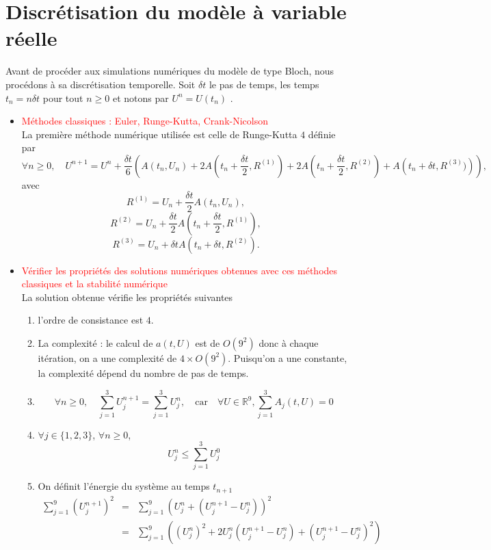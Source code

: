\documentclass[a4paper]{article}
\begin{document}
\section{Discrétisation du modèle à variable réelle}
Avant de procéder aux simulations numériques du modèle de type Bloch, nous procédons à sa discrétisation temporelle. Soit $\delta t$ le pas de temps, les temps $t_n = n \delta t$  pour tout  $n\geq 0$ et notons par $U^n =U(t_n)$ .
\begin{itemize}
\item \textcolor{red}{Méthodes classiques : Euler, Runge-Kutta, Crank-Nicolson}
\\La première méthode numérique utilisée est celle de Runge-Kutta $4$ définie par 
\begin{equation*}
\forall n \geq 0, \quad U^{n+1}=U^n + \frac{\delta t}{6}\left( A(t_n,U_n)+2A\left(t_n+\frac{\delta t}{2},R^{(1)}\right)+2A\left(t_n+\frac{\delta t}{2},R^{(2)}\right)+A\left(t_n+\delta t,R^{(3)})\right)\right),
\end{equation*}
avec 
$$R^{(1)}=U_n + \frac{\delta t}{2} A(t_n,U_n),$$
$$R^{(2)}=U_n + \frac{\delta t}{2} A\left(t_n+\frac{\delta t}{2},R^{(1)}\right),$$
$$R^{(3)}=U_n + \delta t A\left(t_n+\delta t,R^{(2)}\right).$$
\item \textcolor{red}{Vérifier les propriétés des solutions numériques obtenues avec ces méthodes classiques et la stabilité numérique}
\\La solution obtenue vérifie les propriétés suivantes 
\begin{enumerate}
\item l'ordre de consistance est $4$.
\item La complexité : le calcul de $a(t,U)$ est de $O(9^2)$ donc à chaque itération, on a une complexité de $4\times O(9^2)$. Puisqu'on a une constante, la complexité dépend du nombre de pas de temps.
 \item $$\forall n\geq 0, \quad \sum_{j=1}^{3} U^{n+1}_j = \sum_{j=1}^{3} U^{n}_j,\quad\text{car}\quad \forall U \in \mathbb{R}^9, \sum_{j=1}^{3} A_j(t,U)=0$$
\item $\forall j \in \{1,2,3\}$, $\forall n \geq 0$, 
$$U^{n}_j \leq \sum_{j=1}^{3} U^{0}_j$$
\item On définit l'énergie du système au temps $t_{n+1}$
\begin{eqnarray*}
\sum_{j=1}^{9} \left(U_{j}^{n+1} \right)^2 & =& \sum_{j=1}^{9} \left(U_{j}^{n} +(U_{j}^{n+1}-U_{j}^{n}) \right)^2  \\
&=& \sum_{j=1}^{9} \left(\left(U_{j}^{n} \right)^2 + 2 U_{j}^{n}  \left( U_{j}^{n+1}-U_{j}^{n}\right)+ \left(U_{j}^{n+1}-U_{j}^{n}\right)^2 \right)

\end{eqnarray*}
\end{enumerate}
\end{itemize}
\end{document}
